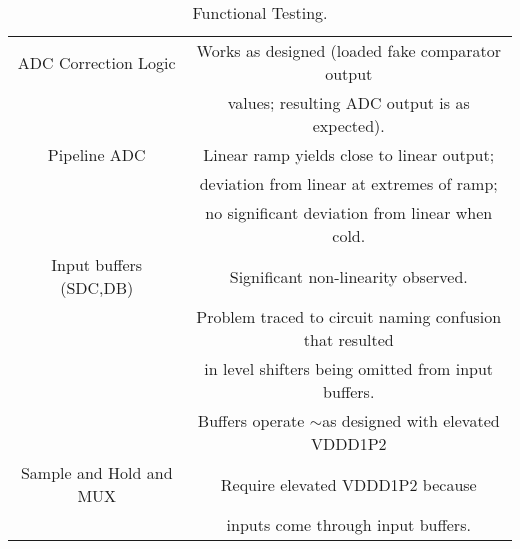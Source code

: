 \begin{table}[h]
\begin{tabular}{|c|c|}
 ADC Correction Logic & Works as designed (loaded fake comparator output \\ 
  & values; resulting ADC output is as expected). \\ \hline
Pipeline ADC & Linear ramp yields close to linear output; \\ 
 & deviation from linear at extremes of ramp; \\ 
  & no significant deviation from linear when cold. \\ \hline
Input buffers (SDC,DB) & Significant non-linearity observed. \\ 
 & Problem traced to circuit naming confusion that resulted \\ 
 & in level shifters being omitted from input buffers. \\
 & Buffers operate $\sim$as designed with elevated VDDD1P2 \\ \hline
 Sample and Hold and MUX & Require elevated VDDD1P2 because \\ 
 & inputs come through input buffers. \\ \hline
\end{tabular}
\caption{Functional Testing.}
\label{tab:Functionality}
\end{table}
